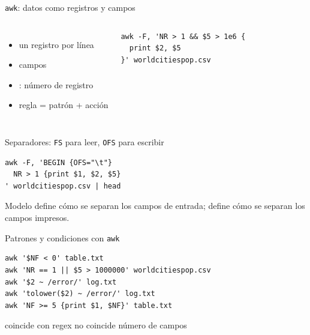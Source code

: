 \documentclass[aspectratio=169,11pt]{beamer}
\begin{document}
\begin{frame}[fragile]{\texttt{awk}: datos como registros y campos}
  \begin{columns}[T,onlytextwidth]
      \begin{itemize}
        \item un registro por línea
        \item campos 
        \item {}: número de registro
        \item regla = patrón + acción
      \end{itemize}
\begin{lstlisting}
awk -F, 'NR > 1 && $5 > 1e6 {
  print $2, $5
}' worldcitiespop.csv
\end{lstlisting}
  \end{columns}
  \vspace{5mm}
  \centering{}
\end{frame}

\begin{frame}[fragile]{Separadores: \texttt{FS} para leer, \texttt{OFS} para escribir}
\begin{lstlisting}
awk -F, 'BEGIN {OFS="\t"}
  NR > 1 {print $1, $2, $5}
' worldcitiespop.csv | head
\end{lstlisting}
  \vspace{5mm}
  \begin{wideblock}{Modelo}
     define cómo se separan los campos de entrada;  define cómo se separan los campos impresos.
  \end{wideblock}
\end{frame}

\begin{frame}[fragile]{Patrones y condiciones con \texttt{awk}}
\begin{lstlisting}
awk '$NF < 0' table.txt
awk 'NR == 1 || $5 > 1000000' worldcitiespop.csv
awk '$2 ~ /error/' log.txt
awk 'tolower($2) ~ /error/' log.txt
awk 'NF >= 5 {print $1, $NF}' table.txt
\end{lstlisting}
  \vspace{4mm}
  \pill{\textasciitilde}\; coincide con regex \quad
  \pill[Cyan]{!\textasciitilde}\; no coincide \quad
  \; número de campos
\end{frame}
\end{document}
